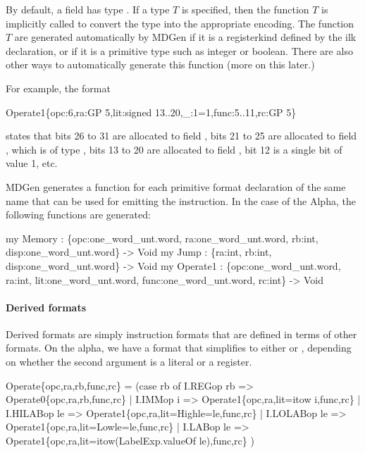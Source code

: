  By default, a field has type .  If a type $T$ 
is specified, then the function $T$ is implicitly called
to convert the type into the appropriate encoding.   The function 
$T$ are generated automatically by MDGen if it is a registerkind
defined by the  ilk declaration, or if it is a primitive
type such as integer or boolean.  
There are also other ways to automatically generate this function
(more on this later.)

  For example, the format 
\begin{SML}
   Operate1\{opc:6,ra:GP 5,lit:signed 13..20,_:1=1,func:5..11,rc:GP 5\} 
\end{SML}
states that bits 26 to 31 are allocated to field , 
bits 21 to 25 are allocated to field , which is of type 
, bits 13 to 20 are allocated to field , bit 12
is a single bit of value 1, etc.


MDGen generates a function for each primitive format declaration of
the same name that can be used for emitting the instruction.  
In the case of the Alpha, the following functions are generated:
\begin{SML}
   my Memory : \{opc:one_word_unt.word, ra:one_word_unt.word, 
                 rb:int, disp:one_word_unt.word\} -> Void
   my Jump   : \{ra:int, rb:int, disp:one_word_unt.word\} -> Void
   my Operate1 : \{opc:one_word_unt.word, ra:int, lit:one_word_unt.word,
                   func:one_word_unt.word, rc:int\} -> Void
\end{SML}

\paragraph{Derived formats}

   Derived formats are simply instruction formats that are defined
in terms of other formats.  On the alpha, we have a 
format that simplifies to either  or ,
depending on whether the second argument is a literal or a register.  
\begin{SML}
   Operate\{opc,ra,rb,func,rc\} =
     (case rb of
       I.REGop rb => Operate0\{opc,ra,rb,func,rc\}
     | I.IMMop i  => Operate1\{opc,ra,lit=itow i,func,rc\}
     | I.HILABop le => Operate1\{opc,ra,lit=High{le=le},func,rc\}
     | I.LOLABop le => Operate1\{opc,ra,lit=Low{le=le},func,rc\}
     | I.LABop le => Operate1\{opc,ra,lit=itow(LabelExp.valueOf le),func,rc\}
     )
\end{SML}

